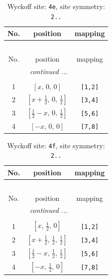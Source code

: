 \documentclass[fleqn,8pt]{jsarticle}
\begin{document}
\begin{longtable}{ccc}
\caption{Wyckoff site: {\tt 4e}, site symmetry: {\tt 2..}}
 \\
 \hline \hline
No. & position & mapping \\ \hline \endfirsthead

\multicolumn{2}{l}{\tablename\ \thetable{}} \\
 \hline \hline
No. & position & mapping \\ \hline \endhead

 \hline \hline
\multicolumn{2}{r}{\footnotesize\it continued ...} \\ \endfoot

 \hline \hline
\multicolumn{2}{r}{} \\ \endlastfoot

1 & $\left[ x,\, 0,\, 0 \right]$ & {\tt [1,2]} \\ \hline
2 & $\left[ x + \frac{1}{2},\, 0,\, \frac{1}{2} \right]$ & {\tt [3,4]} \\ \hline
3 & $\left[ \frac{1}{2} - x,\, 0,\, \frac{1}{2} \right]$ & {\tt [5,6]} \\ \hline
4 & $\left[ - x,\, 0,\, 0 \right]$ & {\tt [7,8]} \\
\end{longtable}
\renewcommand{\arraystretch}{1.2}
\begin{longtable}{ccc}
\caption{Wyckoff site: {\tt 4f}, site symmetry: {\tt 2..}}
 \\
 \hline \hline
No. & position & mapping \\ \hline \endfirsthead

\multicolumn{2}{l}{\tablename\ \thetable{}} \\
 \hline \hline
No. & position & mapping \\ \hline \endhead

 \hline \hline
\multicolumn{2}{r}{\footnotesize\it continued ...} \\ \endfoot

 \hline \hline
\multicolumn{2}{r}{} \\ \endlastfoot

1 & $\left[ x,\, \frac{1}{2},\, 0 \right]$ & {\tt [1,2]} \\ \hline
2 & $\left[ x + \frac{1}{2},\, \frac{1}{2},\, \frac{1}{2} \right]$ & {\tt [3,4]} \\ \hline
3 & $\left[ \frac{1}{2} - x,\, \frac{1}{2},\, \frac{1}{2} \right]$ & {\tt [5,6]} \\ \hline
4 & $\left[ - x,\, \frac{1}{2},\, 0 \right]$ & {\tt [7,8]} \\
\end{longtable}
\end{document}
